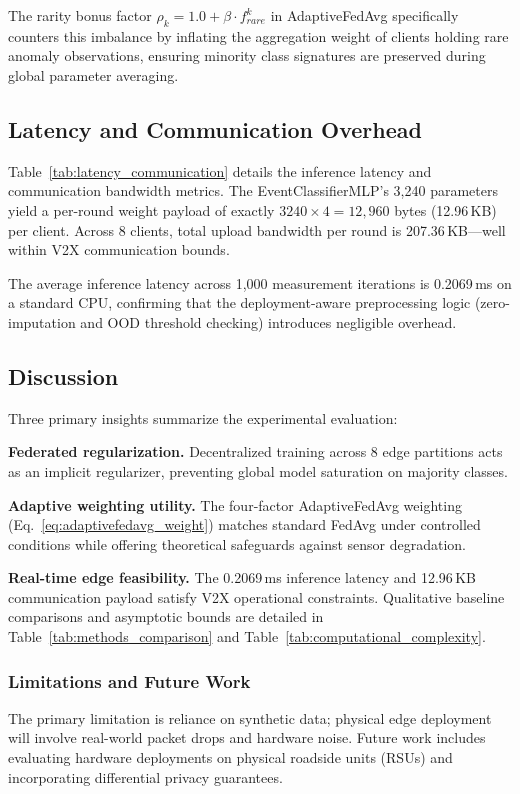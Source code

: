 The rarity bonus factor $\rho_k = 1.0 + \beta \cdot f_{rare}^k$ in AdaptiveFedAvg specifically counters this imbalance by inflating the aggregation weight of clients holding rare anomaly observations, ensuring minority class signatures are preserved during global parameter averaging.

\subsection{Latency and Communication Overhead}

Table~\ref{tab:latency_communication} details the inference latency and communication bandwidth metrics. The EventClassifierMLP's 3,240 parameters yield a per-round weight payload of exactly $3240 \times 4 = 12{,}960$ bytes (12.96\,KB) per client. Across 8 clients, total upload bandwidth per round is 207.36\,KB---well within V2X communication bounds.



The average inference latency across 1,000 measurement iterations is 0.2069\,ms on a standard CPU, confirming that the deployment-aware preprocessing logic (zero-imputation and OOD threshold checking) introduces negligible overhead.

\subsection{Discussion}

Three primary insights summarize the experimental evaluation:

\textbf{Federated regularization.} Decentralized training across 8 edge partitions acts as an implicit regularizer, preventing global model saturation on majority classes.

\textbf{Adaptive weighting utility.} The four-factor AdaptiveFedAvg weighting (Eq.~\ref{eq:adaptivefedavg_weight}) matches standard FedAvg under controlled conditions while offering theoretical safeguards against sensor degradation.

\textbf{Real-time edge feasibility.} The 0.2069\,ms inference latency and 12.96\,KB communication payload satisfy V2X operational constraints. Qualitative baseline comparisons and asymptotic bounds are detailed in Table~\ref{tab:methods_comparison} and Table~\ref{tab:computational_complexity}.





\subsubsection{Limitations and Future Work}

The primary limitation is reliance on synthetic data; physical edge deployment will involve real-world packet drops and hardware noise. Future work includes evaluating hardware deployments on physical roadside units (RSUs) and incorporating differential privacy guarantees.
